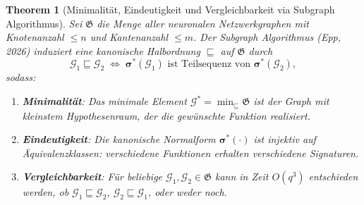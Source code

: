 ﻿\documentclass[12pt, a4paper, openany]{report}
\newtheorem{theorem}{Theorem}[chapter]
\newcommand{\calG}{\mathcal{G}}
\begin{document}
\begin{theorem}[Minimalität, Eindeutigkeit und Vergleichbarkeit via Subgraph Algorithmus]
\label{thm:minimal_unique_comparable}
Sei $\mathfrak{G}$ die Menge aller neuronalen Netzwerkgraphen mit Knotenanzahl
$\leq n$ und Kantenanzahl $\leq m$.  Der Subgraph Algorithmus (Epp, 2026)
induziert eine kanonische Halbordnung $\sqsubseteq$ auf $\mathfrak{G}$ durch
\[
  \calG_1 \sqsubseteq \calG_2
  \;\Leftrightarrow\;
  \bm{\sigma}^*(\calG_1) \text{ ist Teilsequenz von } \bm{\sigma}^*(\calG_2),
\]
sodass:
\begin{enumerate}[label=(\roman*)]
  \item \textbf{Minimalität}: Das minimale Element $\calG^* = \min_{\sqsubseteq} \mathfrak{G}$
    ist der Graph mit kleinstem Hypothesenraum, der die gewünschte Funktion realisiert.
  \item \textbf{Eindeutigkeit}: Die kanonische Normalform $\bm{\sigma}^*(\cdot)$
    ist injektiv auf Äquivalenzklassen: verschiedene Funktionen erhalten
    verschiedene Signaturen.
  \item \textbf{Vergleichbarkeit}: Für beliebige $\calG_1, \calG_2 \in \mathfrak{G}$
    kann in Zeit $O(q^3)$ entschieden werden, ob $\calG_1 \sqsubseteq \calG_2$,
    $\calG_2 \sqsubseteq \calG_1$, oder weder noch.
\end{enumerate}
\end{theorem}
\end{document}
